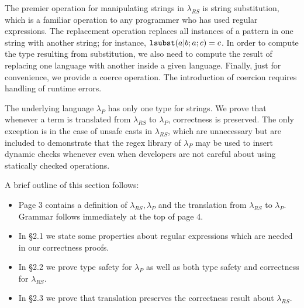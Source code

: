 \documentclass[9pt]{sig-alternate}
\theoremstyle{definition}
\newcommand{\lambdas}{\lambda_{RS}}
\newcommand{\lambdap}{\lambda_P}
\newcommand{\lsubst}[3]{{\tt lsubst}(#1;#2;#3)} %
\begin{document}
The premier operation for manipulating strings in $\lambdas$ is string substitution, 
which is a familiar operation to any programmer who has used regular expressions.
The replacement operation replaces all instances of a pattern in one string with
another string; for instance, $\lsubst{a|b}{a}{c} = c$.
In order to compute the type resulting from substitution, we also need to compute
the result of replacing one language with another inside a given language.
Finally, just for convenience, we provide a coerce operation. The introduction of
coercion requires handling of runtime errors.

The underlying language $\lambdap$ has only one type for strings. We prove that whenever
a term is translated from $\lambdas$ to $\lambdap$, correctness is preserved.
The only exception is in the case of unsafe casts in $\lambdas$, which are unnecessary but
are included to demonstrate that the regex library of $\lambdap$ may be used to insert
dynamic checks whenever even when developers are not careful about using statically checked
operations.

A brief outline of this section follows:
\begin{itemize}
  \item Page 3 contains a definition of $\lambdas, \lambdap$ and the translation from $\lambdas$ to $\lambdap$. Grammar follows immediately at the top of page 4.
  \item In \S 2.1 we state some properties about regular expressions which are needed in our correctness proofs.
   \item In \S 2.2 we prove type safety for $\lambdap$ as well as both type safety and correctness for $\lambdas$.
  \item In \S 2.3 we prove that translation preserves the correctness result about $\lambdas$.
\end{itemize}
\end{document}
